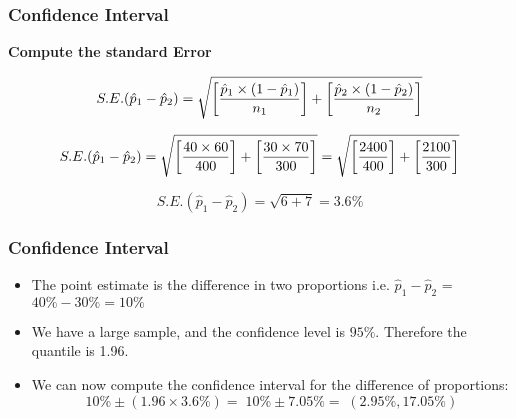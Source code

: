 \documentclass[a4]{beamer}
\begin{document}

\begin{frame}
\frametitle{Confidence Interval}
\textbf{Compute the standard Error}

\[ S.E. (\hat{p}_1 - \hat{p}_2) =
\sqrt{ \left[{\hat{p}_1 \times (1 - \hat{p}_1) \over n_1}\right] + \left[{\hat{p}_2 \times (1 - \hat{p}_2) \over n_2}\right] } \]

\[ S.E. (\hat{p}_1 - \hat{p}_2) =
\sqrt{ \left[{40 \times 60 \over 400}\right] + \left[{30 \times 70 \over 300}\right] }  = \sqrt{ \left[{2400 \over 400}\right] + \left[{2100\over 300}\right] } \]

\[ S.E. (\hat{p}_1 - \hat{p}_2)
= \sqrt{ 6 + 7 } = 3.6\% \]

\end{frame}


\begin{frame}
\frametitle{Confidence Interval}
\begin{itemize}
\item The point estimate is the difference in two proportions i.e. $\hat{p}_1 - \hat{p}_2$ = $40 \% - 30 \% = 10 \%$
\item We have a large sample, and the confidence level is $95\%$. Therefore the quantile is 1.96.
\item We can now compute the confidence interval for the difference of proportions:
\[ 10\% \pm (1.96 \times 3.6 \%)  =\; 10\% \pm 7.05 \% = \;(2.95\%, 17.05\%) \]

\end{itemize}
\end{frame}
\end{document}

